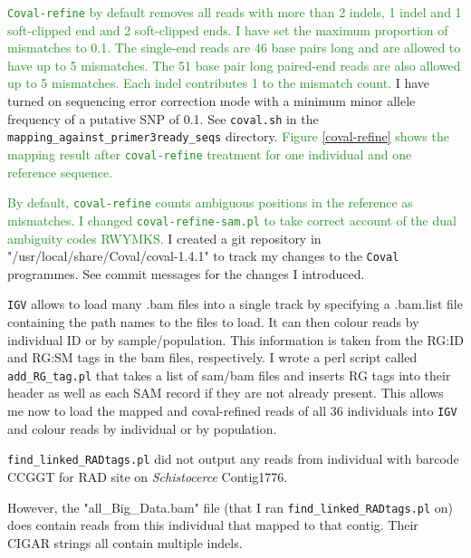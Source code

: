 \documentclass{article}\usepackage[]{graphicx}\usepackage[]{color}
\newcommand{\roger}[1]{ \textcolor[named]{ForestGreen}{#1} }
\begin{document}
\roger{\texttt{Coval-refine} by default removes all reads with more than 2 indels, 1 indel and 1 soft-clipped end and 2 soft-clipped ends. I have set the maximum proportion of mismatches to 0.1. The single-end reads are 46 base pairs long and are allowed to have up to 5 mismatches. The 51 base pair long paired-end reads are also allowed up to 5 mismatches. Each indel contributes 1 to the mismatch count.} 
I have turned on sequencing error correction mode with a minimum minor allele  frequency of a putative SNP of 0.1. See \texttt{coval.sh} in the \texttt{mapping\_against\_primer3ready\_seqs} directory. 
\roger{Figure \ref{coval-refine} shows the mapping result after \texttt{coval-refine} treatment for one individual and one reference sequence.}

\roger{By default, \texttt{coval-refine} counts ambiguous positions in the reference as mismatches. I changed \texttt{coval-refine-sam.pl} to take correct account of the dual ambiguity codes RWYMKS.} I created a git repository in "/usr/local/share/Coval/coval-1.4.1" to track my changes to the \texttt{Coval} programmes. See commit messages for the changes I introduced.

\texttt{IGV} allows to load many .bam files into a single track by specifying a .bam.list file containing the path names to the files to load. It can then colour reads by individual ID or by sample/population. This information is taken from the RG:ID and RG:SM tags in the bam files, respectively. I wrote a perl script called \texttt{add\_RG\_tag.pl} that takes a list of sam/bam files and inserts RG tags into their header as well as each SAM record if they are not already present. This allows me now to load the mapped and coval-refined reads of all 36 individuals into \texttt{IGV} and colour reads by individual or by population.

\hypertarget{CCGGT}{
\texttt{find\_linked\_RADtags.pl} did not output any reads from individual with barcode CCGGT for RAD site on \textit{Schistocerce} Contig1776. 
}
However, the "all\_Big\_Data.bam" file (that I ran \texttt{find\_linked\_RADtags.pl} on) does contain reads from this individual that mapped to that contig. Their CIGAR strings all contain multiple indels. 
\end{document}
